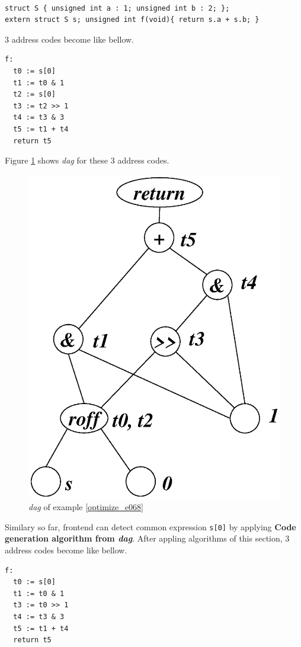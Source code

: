 \begin{Example}
\label{optimize_e068}
\begin{verbatim}

struct S { unsigned int a : 1; unsigned int b : 2; };
extern struct S s; unsigned int f(void){ return s.a + s.b; }
\end{verbatim}
3 address codes become like bellow.
\begin{verbatim}
f:
  t0 := s[0]
  t1 := t0 & 1
  t2 := s[0]
  t3 := t2 >> 1
  t4 := t3 & 3
  t5 := t1 + t4
  return t5
\end{verbatim}
Figure \ref{optimize_e069} shows {\em dag} for these 3 address codes.
\begin{figure}[htbp]
\begin{center}
\includegraphics[width=0.826\linewidth,height=1.0\linewidth]{opt028.eps}
\caption{{\em dag} of example \ref{optimize_e068}}
\label{optimize_e069}
\end{center}
\end{figure}
Similary so far, frontend can detect common expression {\tt{s[0]}}
by applying {\bf Code generation algorithm from {\em dag}}.
After appling algorithms of this section,
3 address codes become like bellow.
\begin{verbatim}
f:
  t0 := s[0]
  t1 := t0 & 1
  t3 := t0 >> 1
  t4 := t3 & 3
  t5 := t1 + t4
  return t5
\end{verbatim}
\end{Example}

